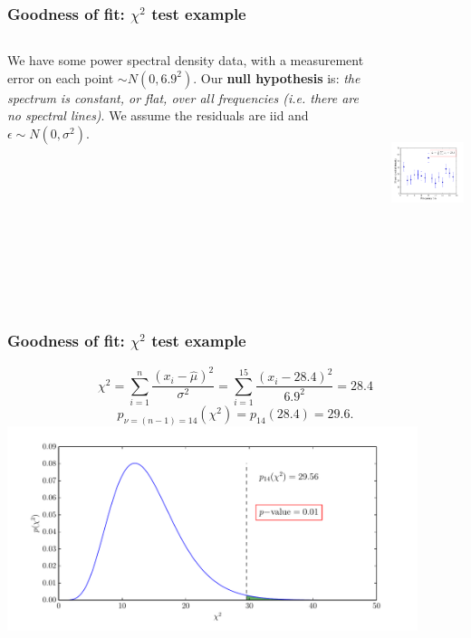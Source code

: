 \begin{frame}

\frametitle{Goodness of fit: $\chi^2$ test example}
\label{goodnessoffit:chi2testexample}

\begin{columns}
    \begin{column}{0.35\textwidth}

We have some power spectral density data, with a measurement error on each point $\sim N(0, 6.9^2)$.
Our \textbf{null hypothesis} is: \emph{the spectrum is constant, or flat, over all frequencies (i.e. there
are no spectral lines)}. We assume the residuals are iid and $\epsilon \sim N(0, \sigma^2)$.
\end{column}
    \begin{column}{0.65\textwidth}
\includegraphics[keepaspectratio,width=\textwidth,height=200pt]{figures/chisquared_data.pdf}
\end{column}
\end{columns}

\end{frame}

\begin{frame}

\frametitle{Goodness of fit: $\chi^2$ test example}
\label{goodnessoffit:chi2testexample}

\[
\chi^2 = \sum_{i=1}^{n} \frac{(x_i - \hat{\mu})^2}{\sigma^2} = \sum_{i=1}^{15} \frac{(x_i-28.4)^2}{6.9^2} = 28.4
\]
\[
p_{\nu=(n-1)=14}(\chi^2) = p_{14}(28.4) = 29.6.
\]
\includegraphics[keepaspectratio,width=\textwidth,height=170pt]{figures/chisquared_pdf.pdf}

\end{frame}

